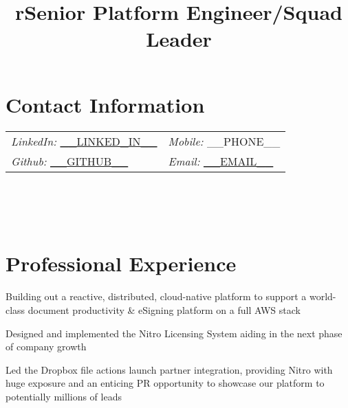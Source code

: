 \documentclass[margin,line]{resume}
\newenvironment{bullet-list}{
  \begin{list}{$\bullet$}{%
      \setlength{\itemsep}{0in}
      \setlength{\parsep}{0in} \setlength{\parskip}{0in}
      \setlength{\topsep}{0in} \setlength{\partopsep}{0in}
      \setlength{\leftmargin}{0.2in}}}{\end{list}}
\begin{document}
\begin{resume}

\section{\sc Contact Information}
\vspace{.05in}
\begin{tabular}{@{}p{3.87in}p{2in}}
    {\it LinkedIn:} \href{https://www.__LINKEDIN__}{__LINKED_IN__}     & \hfill{\it Mobile:} __PHONE__\\
{\it Github:} \href{https://__GITHUB__}{__GITHUB__}     & \hfill{\it Email:} \href{mailto:__EMAIL__}{__EMAIL__}\\
\end{tabular}

\begin{format}
  \title{r}\\
  \\
  \body\\
\end{format}

\section{\sc Professional Experience}

\title{Senior Platform Engineer/Squad Leader}
\begin{position}
\vspace{-.3cm}
\begin{bullet-list}
\item Building out a reactive, distributed, cloud-native platform to support a
world-class document productivity \& eSigning platform on a full AWS stack
\item Designed and implemented the Nitro Licensing System aiding in
the next phase of company growth
\item Led the Dropbox file actions launch partner integration, providing Nitro
with huge exposure and an enticing PR opportunity to showcase our platform to
potentially millions of leads
\end{bullet-list}
\end{position}


\end{resume}
\end{document}
